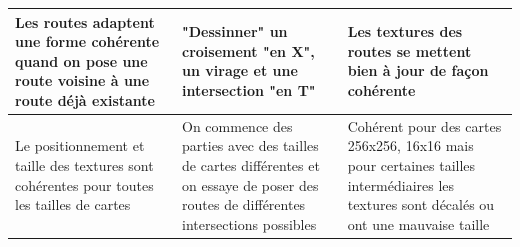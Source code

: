 \documentclass[a4paper,10pt,openany,oneside]{report}
\begin{document}
\begin{center}
\begin{tabular}{| p{3cm} | p{6cm} | p{6cm} |}
		\\ \hline Les routes adaptent une forme cohérente quand on pose une route voisine à une route déjà existante & "Dessinner" un croisement "en X", un virage et une intersection "en T" & Les textures des routes se mettent bien à jour de façon cohérente
		\\ \hline Le positionnement et taille des textures sont cohérentes pour toutes les tailles de cartes & On commence des parties avec des tailles de cartes différentes et on essaye de poser des routes de différentes intersections possibles & Cohérent pour des cartes 256x256, 16x16 mais pour certaines tailles intermédiaires les textures sont décalés ou ont une mauvaise taille
	
	\end{tabular}
\end{center}
\end{document}
